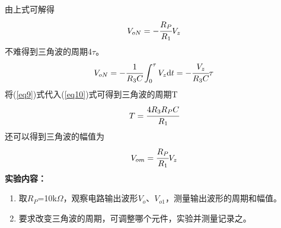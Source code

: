 \documentclass[a4paper]{article}
\begin{document}
由上式可解得
\begin{equation}
V_{oN} = -\cfrac{R_P}{R_1}V_z\label{eq9}
\end{equation}
不难得到三角波的周期4$\tau$。
\begin{equation}
V_{oN} = -\cfrac{1}{R_3C}\int_{0}^{\tau}V_z\text{d}t = -\cfrac{V_z}{R_3C}\tau\label{eq10}
\end{equation}
将(\ref{eq9})式代入(\ref{eq10})式可得到三角波的周期T
\begin{equation}
T = \cfrac{4R_3R_PC}{R_1}\label{eq11}
\end{equation}
还可以得到三角波的幅值为
\begin{equation}
V_{om} = \cfrac{R_P}{R_1}V_z\label{eq12}
\end{equation}
\textbf{实验内容：}
\begin{enumerate}
\item 取$R_P$=10k$\Omega$，观察电路输出波形$V_o$、$V_{o1}$，测量输出波形的周期和幅值。
\item 要求改变三角波的周期，可调整哪个元件，实验并测量记录之。
\end{enumerate}
\end{document}
